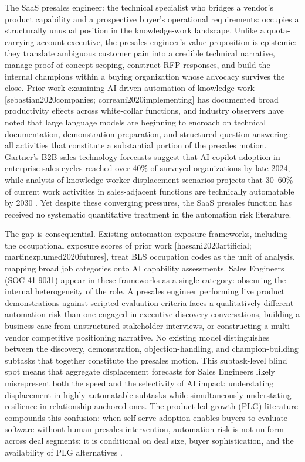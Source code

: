 \documentclass[10pt, conference]{IEEEtran}
\begin{document}
\label{sec:introduction}

The SaaS presales engineer: the technical specialist who bridges a vendor's product capability and a prospective buyer's operational requirements: occupies a structurally unusual position in the knowledge-work landscape. Unlike a quota-carrying account executive, the presales engineer's value proposition is epistemic: they translate ambiguous customer pain into a credible technical narrative, manage proof-of-concept scoping, construct RFP responses, and build the internal champions within a buying organization whose advocacy survives the close. Prior work examining AI-driven automation of knowledge work [sebastian2020companies; correani2020implementing] has documented broad productivity effects across white-collar functions, and industry observers have noted that large language models are beginning to encroach on technical documentation, demonstration preparation, and structured question-answering: all activities that constitute a substantial portion of the presales motion. Gartner's B2B sales technology forecasts suggest that AI copilot adoption in enterprise sales cycles reached over 40\% of surveyed organizations by late 2024, while analysis of knowledge worker displacement scenarios projects that 30--60\% of current work activities in sales-adjacent functions are technically automatable by 2030 \cite{johnk2020ready}. Yet despite these converging pressures, the SaaS presales function has received no systematic quantitative treatment in the automation risk literature.

The gap is consequential. Existing automation exposure frameworks, including the occupational exposure scores of prior work [hassani2020artificial; martinezplumed2020futures], treat BLS occupation codes as the unit of analysis, mapping broad job categories onto AI capability assessments. Sales Engineers (SOC 41-9031) appear in these frameworks as a single category: obscuring the internal heterogeneity of the role. A presales engineer performing live product demonstrations against scripted evaluation criteria faces a qualitatively different automation risk than one engaged in executive discovery conversations, building a business case from unstructured stakeholder interviews, or constructing a multi-vendor competitive positioning narrative. No existing model distinguishes between the discovery, demonstration, objection-handling, and champion-building subtasks that together constitute the presales motion. This subtask-level blind spot means that aggregate displacement forecasts for Sales Engineers likely misrepresent both the speed and the selectivity of AI impact: understating displacement in highly automatable subtasks while simultaneously understating resilience in relationship-anchored ones. The product-led growth (PLG) literature compounds this confusion: when self-serve adoption enables buyers to evaluate software without human presales intervention, automation risk is not uniform across deal segments: it is conditional on deal size, buyer sophistication, and the availability of PLG alternatives \cite{davis2021varieties}.
\end{document}
